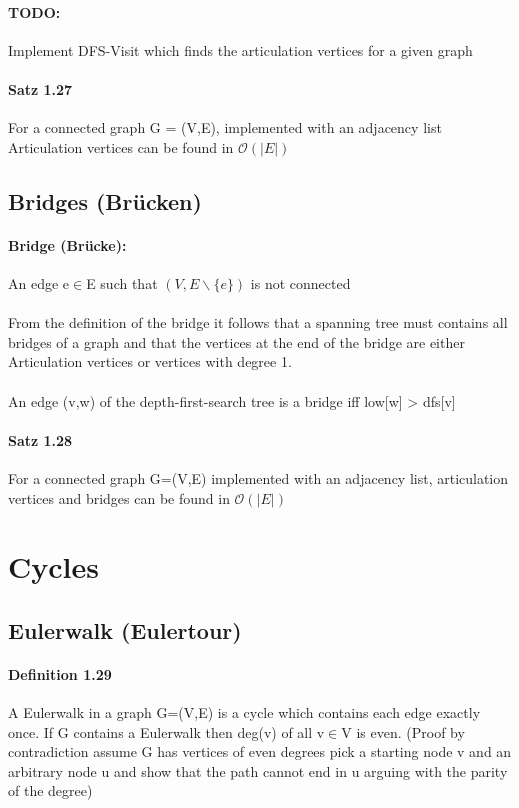 \documentclass[8pt]{extreport}
\begin{document}
\paragraph{TODO:} Implement DFS-Visit which finds the articulation vertices for a given graph
\paragraph{Satz 1.27} For a connected graph G = (V,E), implemented with an adjacency list Articulation vertices can be found in $ \mathcal{O}(|E|)$
\subsection{Bridges (Brücken)}
\paragraph{Bridge (Brücke):} An edge e$\in$E such that $(V,E\backslash \{e\})$ is not connected
\paragraph {}From the definition of the bridge it follows that a spanning tree must contains all bridges of a graph and that the vertices at the end of the bridge are either Articulation vertices or vertices with degree 1.
\paragraph{} An edge (v,w) of the depth-first-search tree is a bridge iff low[w] > dfs[v]
\paragraph{Satz 1.28} For a connected graph G=(V,E) implemented with an adjacency list, articulation vertices and bridges can be found in $\mathcal{O}(|E|)$
\section{Cycles}
\subsection{Eulerwalk (Eulertour)}
\paragraph{Definition 1.29} A Eulerwalk in a graph G=(V,E) is a cycle which contains each edge exactly once. If G contains a Eulerwalk then deg(v) of all v$\in$V is even. (Proof by contradiction assume G has vertices of even degrees pick a starting node v and an arbitrary node u and show that the path cannot end in u arguing with the parity of the degree)
\end{document}
